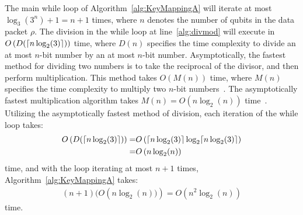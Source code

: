 The main while loop of Algorithm~\ref{alg:KeyMappingA} will iterate at most $\log_{3}(3^n) + 1 = n + 1$ times, where $n$ denotes the number of qubits in the data packet $\rho$. The division in the while loop at line~\ref{alg:divmod} will execute in $O\left(D(\lceil n \log_2 (3)\rceil)\right)$ time, where $D\left(n\right)$ specifies the time complexity to divide an at most $n$-bit number by an at most $n$-bit number. Asymptotically, the fastest method for dividing two numbers is to take the reciprocal of the divisor, and then perform multiplication. This method takes $O\left(M(n)\right)$ time, where $M\left(n\right)$ specifies the time complexity to multiply two $n$-bit numbers~\cite{FastDivision,granlund2010gnu}. The asymptotically fastest multiplication algorithm takes $M\left(n\right) = O\left(n\log_2 (n)\right)$ time~\cite{harvey2021integer}. Utilizing the asymptotically fastest method of division, each iteration of the while loop takes:
\begin{align}
O\left(D(\lceil n \log_2 (3)\rceil)\right) = &O\left(\lceil n \log_2 (3)\rceil\log_2 \lceil n \log_2 (3)\rceil\right)\\
= &O\left(n\log_2 (n)\right)
\end{align}
time, and with the loop iterating at most $n + 1$ times, Algorithm~\ref{alg:KeyMappingA} takes:
\begin{align}
(n + 1)(O\left(n \log_2(n))\right) = O\left(n^2 \log_2(n)\right)
\end{align}
time.

